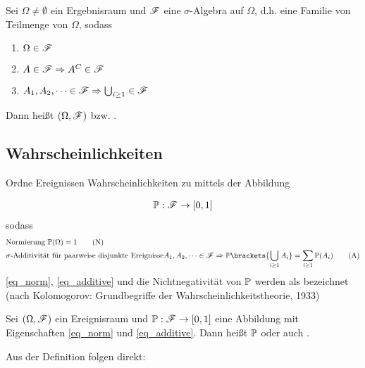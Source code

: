 \begin{definition}
	Sei $\Omega \neq \emptyset$ ein Ergebnisraum und $\mathscr{F}$ eine $\sigma$-Algebra auf $\Omega$, d.h. eine Familie von Teilmenge von $\Omega$, sodass
	\begin{enumerate}
		\item $\Omega \in \mathscr{F}$
		\item $A \in \mathscr{F} \Rightarrow A^C \in \mathscr{F}$
		\item $A_1, A_2, \dots \in \mathscr{F} \Rightarrow \bigcup_{i \ge 1} \in \mathscr{F}$
	\end{enumerate}
	Dann heißt $(\Omega, \mathscr{F})$  bzw. .
\end{definition}

\subsection*{Wahrscheinlichkeiten}

Ordne Ereignissen Wahrscheinlichkeiten zu mittels der Abbildung

\begin{align}
	\mathbb{P}: \mathscr{F} \to [0,1]\notag
\end{align}
sodass
\begin{align}
	&\text{Normierung } \probp(\Omega) = 1 \label{eq_norm}\tag{N}\\
	&\sigma\text{-Additivität für paarweise disjunkte Ereignisse} 
	A_1, A_2, \dots \in \sigF \Rightarrow \probp\brackets{\bigcup_{i \ge 1} A_i} = \sum_{i \ge 1} \probp(A_i) \label{eq_additive}\tag{A}
\end{align}
\eqref{eq_norm}, \eqref{eq_additive} und die Nichtnegativität von $\mathbb{P}$ werden als  bezeichnet (nach Kolomogorov: Grundbegriffe der Wahrscheinlichkeitstheorie, 1933)

\begin{definition}
	Sei $(\Omega, \mathscr{F})$ ein Ereignisraum und $\mathbb{P}: \mathscr{F} \to [0,1]$ eine Abbildung mit Eigenschaften \eqref{eq_norm} und \eqref{eq_additive}. Dann heißt $\mathbb{P}$  oder auch .
\end{definition}

Aus der Definition folgen direkt:

